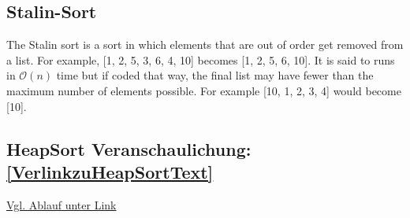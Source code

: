 \documentclass[a4paper]{article}
\begin{document}
\subsection{Stalin-Sort}
The Stalin sort is a sort in which elements that are out of order get removed from a list. For example, [1, 2, 5, 3, 6, 4, 10] becomes [1, 2, 5, 6, 10]. It is said to runs in $\mathcal{O}(n)$ time but if coded that way, the final list may have fewer than the maximum number of elements possible. For example [10, 1, 2, 3, 4] would become [10].

\subsection{HeapSort Veranschaulichung: \ref{VerlinkzuHeapSortText}} \href{https://www.programiz.com/dsa/heap-sort}{Vgl. Ablauf unter Link}
\end{document}
